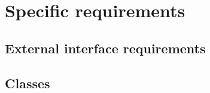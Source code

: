 \section{Specific requirements}
\vp


\subsection{External interface requirements}


\subsection{Classes}
\lstset{language=C++,
}

\subsubsection{\code{\cs/}}

\begin{codes}

\end{codes}

\begin{codes}

\end{codes}

\subsubsection{}

\begin{codes}

\end{codes}

\begin{codes}

\end{codes}

\begin{codes}

\end{codes}

\begin{codes}

\end{codes}

